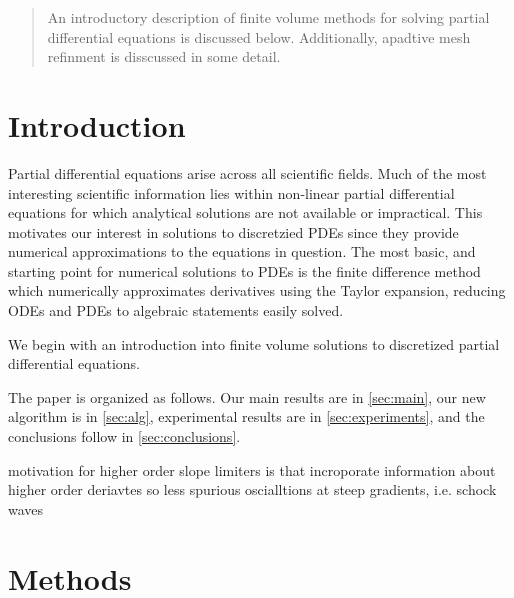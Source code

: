\documentclass[review,onefignum,onetabnum]{siamart171218}
\begin{document}
\maketitle

\begin{abstract}
    An introductory description of finite volume methods for solving partial differential equations is discussed below. Additionally, apadtive mesh refinment is disscussed in some detail. 
\end{abstract}



\section{Introduction}
Partial differential equations arise across all scientific fields. Much of the most interesting scientific information lies within non-linear partial differential equations for which analytical solutions are not available or impractical. This motivates our interest in solutions to discretzied PDEs since they provide numerical approximations to the equations in question. The most basic, and starting point for numerical solutions to PDEs is the finite difference method which numerically approximates derivatives using the Taylor expansion, reducing ODEs and PDEs to algebraic statements easily solved. 


We begin with an introduction into finite volume solutions to discretized partial differential equations. 

The paper is organized as follows. Our main results are in
\cref{sec:main}, our new algorithm is in \cref{sec:alg}, experimental
results are in \cref{sec:experiments}, and the conclusions follow in
\cref{sec:conclusions}.


motivation for higher order slope limiters is that incroporate information about higher order deriavtes so less spurious oscialltions at steep gradients, i.e. schock waves 
\section{Methods}
\label{sec:methods}
\end{document}
